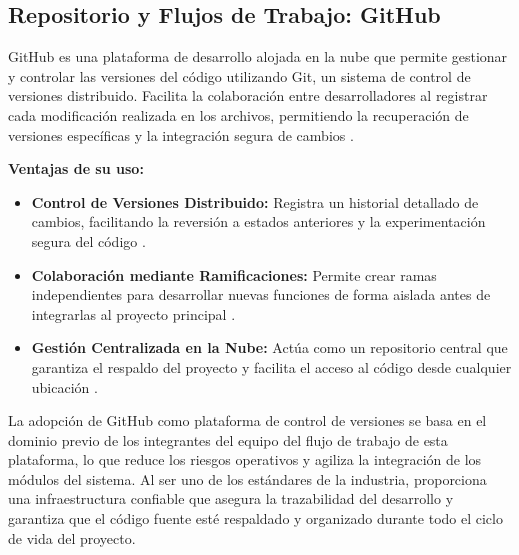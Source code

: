\subsection{Repositorio y Flujos de Trabajo: GitHub}
GitHub es una plataforma de desarrollo alojada en la nube que permite gestionar y controlar las versiones del código utilizando Git, un sistema de control de versiones distribuido. Facilita la colaboración entre desarrolladores al registrar cada modificación realizada en los archivos, permitiendo la recuperación de versiones específicas y la integración segura de cambios \cite{44} \cite{45} .

\textbf{Ventajas de su uso:}
\begin{itemize}
\item \textbf{Control de Versiones Distribuido:} Registra un historial detallado de cambios, facilitando la reversión a estados anteriores y la experimentación segura del código \cite{45} .
\item \textbf{Colaboración mediante Ramificaciones:} Permite crear ramas independientes para desarrollar nuevas funciones de forma aislada antes de integrarlas al proyecto principal \cite{44} .
\item \textbf{Gestión Centralizada en la Nube:} Actúa como un repositorio central que garantiza el respaldo del proyecto y facilita el acceso al código desde cualquier ubicación \cite{44} .
\end{itemize}

La adopción de GitHub como plataforma de control de versiones se basa en el dominio previo de los integrantes del equipo del flujo de trabajo de esta plataforma, lo que reduce los riesgos operativos y agiliza la integración de los módulos del sistema. Al ser uno de los estándares de la industria, proporciona una infraestructura confiable que asegura la trazabilidad del desarrollo y garantiza que el código fuente esté respaldado y organizado durante todo el ciclo de vida del proyecto.